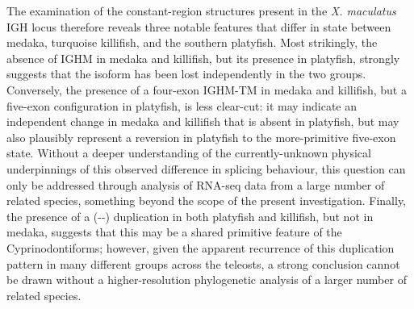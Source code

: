 	The examination of the constant-region structures present in the \textit{X. maculatus} IGH locus therefore reveals three notable features that differ in state between medaka, turquoise killifish, and the southern platyfish. Most strikingly, the absence of IGHM in medaka and killifish, but its presence in platyfish, strongly suggests that the isoform has been lost independently in the two groups. Conversely, the presence of a four-exon IGHM-TM in medaka and killifish, but a five-exon configuration in platyfish, is less clear-cut: it may indicate an independent change in medaka and killifish that is absent in platyfish, but may also plausibly represent a reversion in platyfish to the more-primitive five-exon state. Without a deeper understanding of the currently-unknown physical underpinnings of this observed difference in splicing behaviour, this question can only be addressed through analysis of RNA-seq data from a large number of related species, something beyond the scope of the present investigation. %
	Finally, the presence of a (--) duplication in both platyfish and killifish, but not in medaka, suggests that this may be a shared primitive feature of the Cyprinodontiforms; however, given the apparent recurrence of this duplication pattern in many different groups across the teleosts, a strong conclusion cannot be drawn without a higher-resolution phylogenetic analysis of a larger number of related species. %
	
